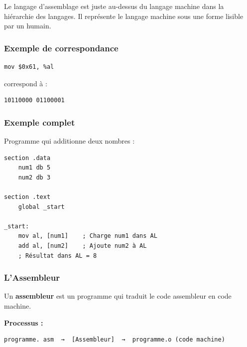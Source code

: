 \documentclass[12pt,a4paper]{article}
\begin{document}
\begin{notecours}
Le langage d'assemblage est juste au-dessus du langage machine dans la hiérarchie des langages. Il représente le langage machine sous une forme lisible par un humain.
\end{notecours}

\subsubsection{Exemple de correspondance}

\begin{exemple}
\begin{lstlisting}[language={[x86masm]Assembler}]
mov $0x61, %al
\end{lstlisting}

correspond à :
\begin{verbatim}
10110000 01100001
\end{verbatim}
\end{exemple}

\subsubsection{Exemple complet}

\begin{exemple}
Programme qui additionne deux nombres : 
\begin{lstlisting}[language={[x86masm]Assembler}]
section .data
    num1 db 5
    num2 db 3
    
section .text
    global _start
    
_start:
    mov al, [num1]    ; Charge num1 dans AL
    add al, [num2]    ; Ajoute num2 à AL
    ; Résultat dans AL = 8
\end{lstlisting}
\end{exemple}

\subsubsection{L'Assembleur}

\begin{definition}
Un \textbf{assembleur} est un programme qui traduit le code assembleur en code machine.
\end{definition}

\begin{astuce}
\textbf{Processus :}
\begin{verbatim}
programme. asm  →  [Assembleur]  →  programme.o (code machine)
\end{verbatim}
\end{astuce}
\end{document}
